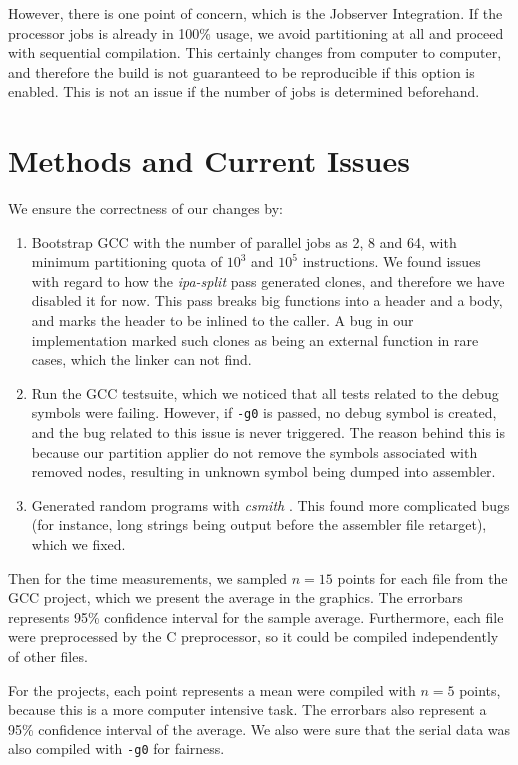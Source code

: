 \documentclass[runningheads]{llncs}
\begin{document}
However, there is one point of concern, which is the Jobserver Integration.  If
the processor jobs is already in 100\% usage, we avoid partitioning at all and
proceed with sequential compilation. This certainly changes from computer to
computer, and therefore the build is not guaranteed to be reproducible if this
option is enabled. This is not an issue if the number of jobs is determined
beforehand.

\section{Methods and Current Issues}\label{sec:methods}

We ensure the correctness of our changes by:
\begin{enumerate}
	\item Bootstrap GCC with the number of parallel jobs as 2, 8 and 64, with
	minimum partitioning quota of $10^3$ and $10^5$ instructions. We found issues
	with regard to how the \textit{ipa-split} pass generated clones, and therefore
	we have disabled it for now. This pass breaks big functions
	into a header and a body, and marks the header to be inlined to the caller.
	A bug in our implementation marked such clones as being an external function in
	rare cases, which the linker can not find.

	\item Run the GCC testsuite, which we noticed that all tests related to the debug
	symbols were failing. However, if \texttt{-g0} is passed, no debug symbol is created,
	and the bug related to this issue is never triggered. The reason behind this is
	because our partition applier do not remove the symbols associated with removed
	nodes, resulting in unknown symbol being dumped into assembler.

	\item Generated random programs with \textit{csmith} \cite{yang2011finding}. This found more complicated
	bugs (for instance, long strings being output before the assembler file retarget),
	which we fixed.
\end{enumerate}

Then for the time measurements, we sampled $n = 15$ points for each file from
the GCC project, which we present the average in the graphics. The errorbars
represents 95\% confidence interval for the sample average. Furthermore, each
file were preprocessed by the C preprocessor, so it could be compiled independently
of other files.

For the projects, each point represents a mean were compiled with $n = 5$ points,
because this is a more computer intensive task. The errorbars also represent a 95\%
confidence interval of the average. We also were sure that the serial data was also
compiled with \texttt{-g0} for fairness.
\end{document}
